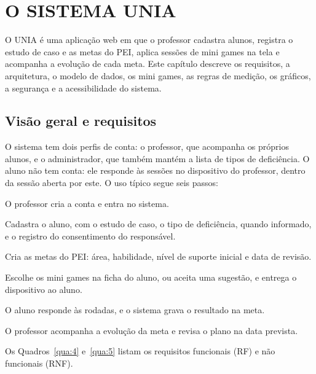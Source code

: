 
\chapter{O SISTEMA UNIA}\label{cap:4}

O UNIA é uma aplicação web em que o professor cadastra alunos, registra o estudo de caso e as metas do PEI, aplica sessões de mini games na tela e acompanha a evolução de cada meta. Este capítulo descreve os requisitos, a arquitetura, o modelo de dados, os mini games, as regras de medição, os gráficos, a segurança e a acessibilidade do sistema.

\section{Visão geral e requisitos}\label{sec:4.1}

O sistema tem dois perfis de conta: o professor, que acompanha os próprios alunos, e o administrador, que também mantém a lista de tipos de deficiência. O aluno não tem conta: ele responde às sessões no dispositivo do professor, dentro da sessão aberta por este. O uso típico segue seis passos:

\begin{passos}
  \item O professor cria a conta e entra no sistema.
  \item Cadastra o aluno, com o estudo de caso, o tipo de deficiência, quando informado, e o registro do consentimento do responsável.
  \item Cria as metas do PEI: área, habilidade, nível de suporte inicial e data de revisão.
  \item Escolhe os mini games na ficha do aluno, ou aceita uma sugestão, e entrega o dispositivo ao aluno.
  \item O aluno responde às rodadas, e o sistema grava o resultado na meta.
  \item O professor acompanha a evolução da meta e revisa o plano na data prevista.
\end{passos}

Os Quadros~\ref{qua:4} e~\ref{qua:5} listam os requisitos funcionais (RF) e não funcionais (RNF).

